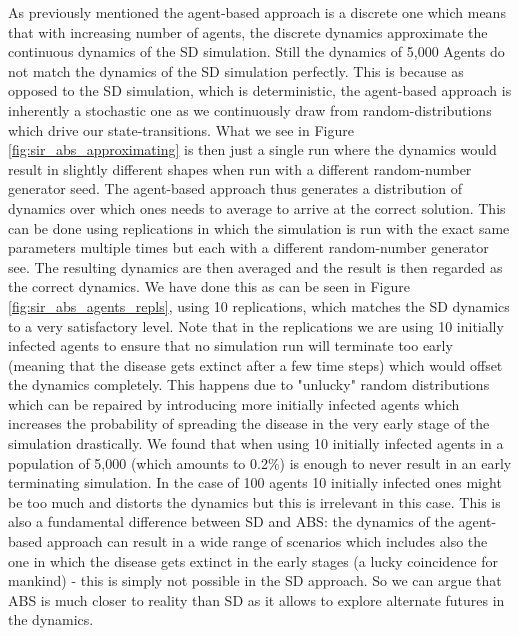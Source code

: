 As previously mentioned the agent-based approach is a discrete one which means that with increasing number of agents, the discrete dynamics approximate the continuous dynamics of the SD simulation. Still the dynamics of 5,000 Agents do not match the dynamics of the SD simulation perfectly. This is because as opposed to the SD simulation, which is deterministic, the agent-based approach is inherently a stochastic one as we continuously draw from random-distributions which drive our state-transitions. What we see in Figure \ref{fig:sir_abs_approximating} is then just a single run where the dynamics would result in slightly different shapes when run with a different random-number generator seed. The agent-based approach thus generates a distribution of dynamics over which ones needs to average to arrive at the correct solution. This can be done using replications in which the simulation is run with the exact same parameters multiple times but each with a different random-number generator see. The resulting dynamics are then averaged and the result is then regarded as the correct dynamics.
We have done this as can be seen in Figure \ref{fig:sir_abs_agents_repls}, using 10 replications, which matches the SD dynamics to a very satisfactory level. Note that in the replications we are using 10 initially infected agents to ensure that no simulation run will terminate too early (meaning that the disease gets extinct after a few time steps) which would offset the dynamics completely. This happens due to "unlucky" random distributions which can be repaired by introducing more initially infected agents which increases the probability of spreading the disease in the very early stage of the simulation drastically. We found that when using 10 initially infected agents in a population of 5,000 (which amounts to 0.2\%) is enough to never result in an early terminating simulation. In the case of 100 agents 10 initially infected ones might be too much and distorts the dynamics but this is irrelevant in this case. This is also a fundamental difference between SD and ABS: the dynamics of the agent-based approach can result in a wide range of scenarios which includes also the one in which the disease gets extinct in the early stages (a lucky coincidence for mankind) - this is simply not possible in the SD approach. So we can argue that ABS is much closer to reality than SD as it allows to explore alternate futures in the dynamics.


